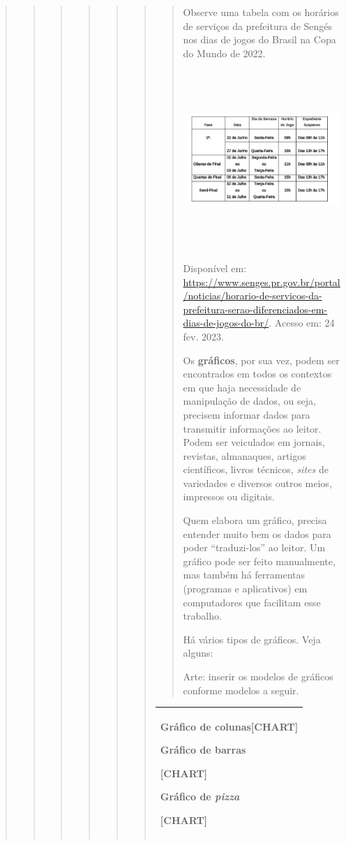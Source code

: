 \begin{quote}
\begin{quote}
\begin{quote}
\begin{quote}
\begin{quote}
\begin{quote}
\begin{quote}
Observe uma tabela com os horários de serviços da prefeitura de Sengés
nos dias de jogos do Brasil na Copa do Mundo de 2022.

\includegraphics[width=4.56744in,height=2.66667in]{media/image28.png}

Disponível em:
\url{https://www.senges.pr.gov.br/portal/noticias/horario-de-servicos-da-prefeitura-serao-diferenciados-em-dias-de-jogos-do-br/}.
Acesso em: 24 fev. 2023.

Os \textbf{gráficos}, por sua vez, podem ser encontrados em todos os
contextos em que haja necessidade de manipulação de dados, ou seja,
precisem informar dados para transmitir informações ao leitor. Podem ser
veiculados em jornais, revistas, almanaques, artigos científicos, livros
técnicos, \emph{sites} de variedades e diversos outros meios, impressos
ou digitais.

Quem elabora um gráfico, precisa entender muito bem os dados para poder
``traduzi-los'' ao leitor. Um gráfico pode ser feito manualmente, mas
também há ferramentas (programas e aplicativos) em computadores que
facilitam esse trabalho.

Há vários tipos de gráficos. Veja alguns:

Arte: inserir os modelos de gráficos conforme modelos a seguir.
\end{quote}

\begin{longtable}[]{@{}l@{}}
\toprule
\begin{minipage}[t]{0.97\columnwidth}\raggedright\strut
Gráfico de colunas{{[}CHART{]}}

Gráfico de barras

{{[}CHART{]}}

Gráfico de \emph{pizza}

{{[}CHART{]}}\strut
\end{minipage}\tabularnewline
\bottomrule
\end{longtable}


\end{quote}
\end{quote}
\end{quote}
\end{quote}
\end{quote}
\end{quote}
